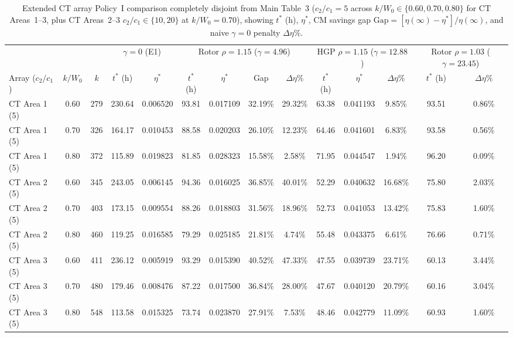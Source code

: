 \documentclass[10pt,a4paper]{article}
\begin{document}
\begin{table}[htbp]
\centering
\scriptsize
\setlength{\tabcolsep}{1.5pt}
\caption{Extended CT array Policy~I comparison completely disjoint from Main Table~3 ($c_2/c_1 = 5$ across $k/W_0 \in \{0.60, 0.70, 0.80\}$ for CT Areas~1--3, plus CT Areas~2--3 $c_2/c_1 \in \{10, 20\}$ at $k/W_0 = 0.70$), showing $t^*$ (h), $\eta^*$, CM savings gap $\mathrm{Gap} = [\eta(\infty)-\eta^*]/\eta(\infty)$, and naive $\gamma = 0$ penalty $\Delta\eta\%$.}
\label{tab:S5}
\begin{tabular*}{\textwidth}{@{\extracolsep{\fill}}lcc|cc|cccc|ccc|cc@{}}
\toprule
 & & & \multicolumn{2}{c|}{$\gamma = 0$ (E1)} & \multicolumn{4}{c|}{Rotor $\rho=1.15$ ($\gamma=4.96$)} & \multicolumn{3}{c|}{HGP $\rho=1.15$ ($\gamma=12.88$)} & \multicolumn{2}{c}{Rotor $\rho=1.03$ ($\gamma=23.45$)} \\
Array ($c_2/c_1$) & $k/W_0$ & $k$ & $t^*$ (h) & $\eta^*$ & $t^*$ (h) & $\eta^*$ & Gap & $\Delta\eta\%$ & $t^*$ (h) & $\eta^*$ & $\Delta\eta\%$ & $t^*$ (h) & $\Delta\eta\%$ \\
\midrule
CT Area 1 (5) & 0.60 & 279 & 230.64 & 0.006520 & 93.81 & 0.017109 & 32.19\% & 29.32\% & 63.38 & 0.041193 & 9.85\% & 93.51 & 0.86\% \\
CT Area 1 (5) & 0.70 & 326 & 164.17 & 0.010453 & 88.58 & 0.020203 & 26.10\% & 12.23\% & 64.46 & 0.041601 & 6.83\% & 93.58 & 0.56\% \\
CT Area 1 (5) & 0.80 & 372 & 115.89 & 0.019823 & 81.85 & 0.028323 & 15.58\% & 2.58\%  & 71.95 & 0.044547 & 1.94\% & 96.20 & 0.09\% \\
\midrule
CT Area 2 (5) & 0.60 & 345 & 243.05 & 0.006145 & 94.36 & 0.016025 & 36.85\% & 40.01\% & 52.29 & 0.040632 & 16.68\% & 75.80 & 2.03\% \\
CT Area 2 (5) & 0.70 & 403 & 173.15 & 0.009554 & 88.26 & 0.018803 & 31.56\% & 18.96\% & 52.73 & 0.041053 & 13.42\% & 75.83 & 1.60\% \\
CT Area 2 (5) & 0.80 & 460 & 119.25 & 0.016585 & 79.29 & 0.025185 & 21.81\% & 4.74\%  & 55.48 & 0.043375 & 6.61\%  & 76.66 & 0.71\% \\
\midrule
CT Area 3 (5) & 0.60 & 411 & 236.12 & 0.005919 & 93.29 & 0.015390 & 40.52\% & 47.33\% & 47.55 & 0.039739 & 23.71\% & 60.13 & 3.44\% \\
CT Area 3 (5) & 0.70 & 480 & 179.46 & 0.008476 & 87.22 & 0.017500 & 36.84\% & 28.00\% & 47.67 & 0.040120 & 20.79\% & 60.16 & 3.04\% \\
CT Area 3 (5) & 0.80 & 548 & 113.58 & 0.015325 & 73.74 & 0.023870 & 27.91\% & 7.53\%  & 48.46 & 0.042779 & 11.09\% & 60.93 & 1.60\% \\

\end{tabular*}
\end{table}
\end{document}

